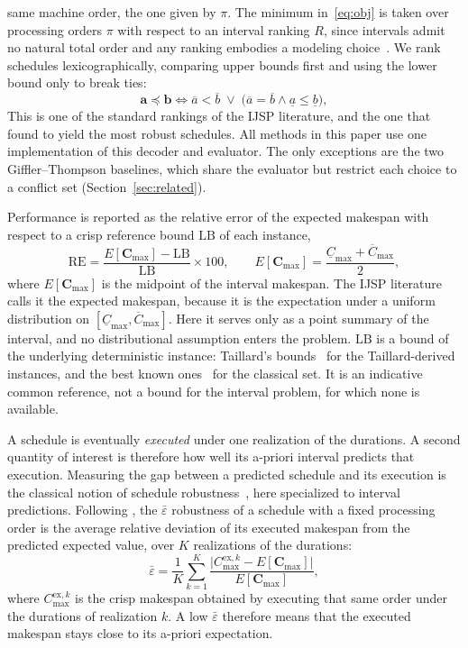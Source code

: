 \documentclass[review,authoryear,11pt]{elsarticle}
\newcommand{\RE}{\mathrm{RE}}
\newcommand{\LB}{\mathrm{LB}}
\begin{document}
same machine order, the one given by $\pi$. The minimum
in~\eqref{eq:obj} is taken over processing orders $\pi$ with respect
to an interval ranking $R$,
since intervals admit no natural total order and any ranking embodies a
modeling choice~\citep{Ishibuchi1990}. We rank schedules
lexicographically, comparing upper bounds first and using the lower
bound only to break ties:
\begin{equation}
\mathbf{a} \preceq \mathbf{b} \iff \overline{a} < \overline{b}
\;\vee\; \big(\overline{a} = \overline{b} \wedge
\underline{a} \le \underline{b}\big),
\label{eq:rank}
\end{equation}
This is one of the standard rankings of the IJSP literature, and the one
that \citet{DiazGA2020} found to yield the most robust schedules. All
methods in this paper use one implementation of this decoder and
evaluator. The only exceptions are the two Giffler--Thompson baselines,
which share the evaluator but restrict each choice to a conflict set
(Section~\ref{sec:related}).

Performance is reported as the relative error of the expected makespan
with respect to a crisp reference bound $\LB$ of each instance,
\begin{equation}
\RE = \frac{E[\mathbf{C}_{\max}] - \LB}{\LB} \times 100,
\qquad
E[\mathbf{C}_{\max}] = \frac{\underline{C}_{\max} +
\overline{C}_{\max}}{2},
\end{equation}
where $E[\mathbf{C}_{\max}]$ is the midpoint of the interval
makespan. The IJSP literature calls it the expected makespan, because it
is the expectation under a uniform distribution on
$[\underline{C}_{\max},\overline{C}_{\max}]$. Here it serves only as a
point summary of the interval, and no distributional assumption enters
the problem. $\LB$ is a bound of the underlying deterministic instance:
Taillard's bounds~\citep{Taillard1993} for the Taillard-derived
instances, and the best known ones~\citep{DiazFEABC2023} for the
classical set. It is an indicative common reference, not a bound for the
interval problem, for which none is available.

A schedule is eventually \emph{executed} under one realization of the
durations. A second quantity of interest is therefore how well its
a-priori interval predicts that execution. Measuring the gap between a predicted
schedule and its execution is the classical notion of schedule
robustness~\citep{Leon1994}, here specialized to interval
predictions. Following \citet{DiazGA2020}, the
$\bar\varepsilon$ robustness of a schedule with a fixed processing order
is the average relative deviation of its executed makespan from the
predicted expected value, over $K$ realizations of the durations:
\begin{equation}
\bar\varepsilon = \frac{1}{K}\sum_{k=1}^{K}
\frac{\big|C^{\mathrm{ex},k}_{\max} - E[\mathbf{C}_{\max}]\big|}
     {E[\mathbf{C}_{\max}]},
\label{eq:eps}
\end{equation}
where $C^{\mathrm{ex},k}_{\max}$ is the crisp makespan obtained by executing that
same order under the durations of realization $k$. A low $\bar\varepsilon$ therefore means that the executed makespan
stays close to its a-priori expectation.
\end{document}
